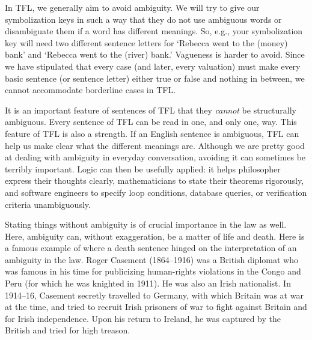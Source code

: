 In TFL, we generally aim to avoid ambiguity. We will try to give our symbolization keys in such a way that they do not use ambiguous words or  disambiguate them if a word has different meanings. So, e.g., your symbolization key will need two different sentence letters for `Rebecca went to the (money) bank' and `Rebecca went to the (river) bank.' Vagueness is harder to avoid. Since we have stipulated that every case (and later, every valuation) must make every basic sentence (or sentence letter) either true or false and nothing in between, we cannot accommodate borderline cases in TFL.

It is an important feature of sentences of TFL that they \emph{cannot} be structurally ambiguous. Every sentence of TFL can be read in one, and only one, way. This feature of TFL is also a strength. If an English sentence is ambiguous, TFL can help us make clear what the different meanings are.  Although we are pretty good at dealing with ambiguity in everyday conversation, avoiding it can sometimes be terribly important. Logic can then be usefully applied: it helps philosopher express their thoughts clearly, mathematicians to state their theorems rigorously, and software engineers to specify loop conditions, database queries, or verification criteria unambiguously.

Stating things without ambiguity is of crucial importance in the law as well. Here, ambiguity can, without exaggeration, be a matter of life and death. Here is a famous example of where a death sentence hinged on the interpretation of an ambiguity in the law. Roger Casement (1864--1916) was a British diplomat who was famous in his time for publicizing human-rights violations in the Congo and Peru (for which he was knighted in 1911). He was also an Irish nationalist. In 1914--16, Casement secretly travelled to Germany, with which Britain was at war at the time, and tried to recruit Irish prisoners of war to fight against Britain and for Irish independence. Upon his return to Ireland, he was captured by the British and tried for high treason.


